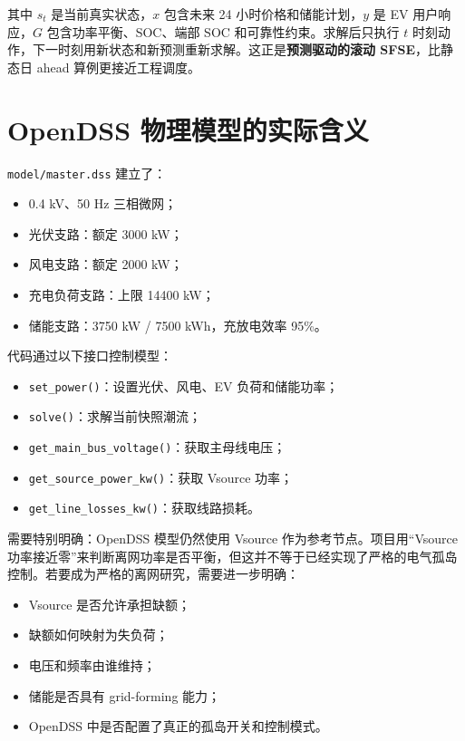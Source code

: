 \documentclass[UTF8,a4paper,11pt]{ctexart}
\begin{document}
其中 $s_t$ 是当前真实状态，$x$ 包含未来 24 小时价格和储能计划，$y$ 是 EV 用户响应，$G$ 包含功率平衡、SOC、端部 SOC 和可靠性约束。求解后只执行 $t$ 时刻动作，下一时刻用新状态和新预测重新求解。这正是\textbf{预测驱动的滚动 SFSE}，比静态日 ahead 算例更接近工程调度。

\section{OpenDSS 物理模型的实际含义}

\texttt{model/master.dss} 建立了：

\begin{itemize}
  \item 0.4 kV、50 Hz 三相微网；
  \item 光伏支路：额定 3000 kW；
  \item 风电支路：额定 2000 kW；
  \item 充电负荷支路：上限 14400 kW；
  \item 储能支路：3750 kW / 7500 kWh，充放电效率 95\%。
\end{itemize}

代码通过以下接口控制模型：

\begin{itemize}
  \item \texttt{set\_power()}：设置光伏、风电、EV 负荷和储能功率；
  \item \texttt{solve()}：求解当前快照潮流；
  \item \texttt{get\_main\_bus\_voltage()}：获取主母线电压；
  \item \texttt{get\_source\_power\_kw()}：获取 Vsource 功率；
  \item \texttt{get\_line\_losses\_kw()}：获取线路损耗。
\end{itemize}

需要特别明确：OpenDSS 模型仍然使用 Vsource 作为参考节点。项目用“Vsource 功率接近零”来判断离网功率是否平衡，但这并不等于已经实现了严格的电气孤岛控制。若要成为严格的离网研究，需要进一步明确：

\begin{itemize}
  \item Vsource 是否允许承担缺额；
  \item 缺额如何映射为失负荷；
  \item 电压和频率由谁维持；
  \item 储能是否具有 grid-forming 能力；
  \item OpenDSS 中是否配置了真正的孤岛开关和控制模式。
\end{itemize}
\end{document}
